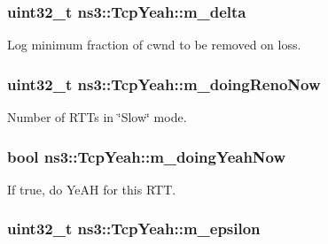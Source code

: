 \subsubsection[{\texorpdfstring{m\+\_\+delta}{m_delta}}]{\setlength{\rightskip}{0pt plus 5cm}uint32\+\_\+t ns3\+::\+Tcp\+Yeah\+::m\+\_\+delta\hspace{0.3cm}{\ttfamily [private]}}\hypertarget{classns3_1_1TcpYeah_af36b0f4c1017a437469d909a22650f84}{}\label{classns3_1_1TcpYeah_af36b0f4c1017a437469d909a22650f84}


Log minimum fraction of cwnd to be removed on loss. 

\subsubsection[{\texorpdfstring{m\+\_\+doing\+Reno\+Now}{m_doingRenoNow}}]{\setlength{\rightskip}{0pt plus 5cm}uint32\+\_\+t ns3\+::\+Tcp\+Yeah\+::m\+\_\+doing\+Reno\+Now\hspace{0.3cm}{\ttfamily [private]}}\hypertarget{classns3_1_1TcpYeah_ad70d5e4310bd47c13bdfe5a665a4a911}{}\label{classns3_1_1TcpYeah_ad70d5e4310bd47c13bdfe5a665a4a911}


Number of R\+T\+Ts in \char`\"{}\+Slow\char`\"{} mode. 

\subsubsection[{\texorpdfstring{m\+\_\+doing\+Yeah\+Now}{m_doingYeahNow}}]{\setlength{\rightskip}{0pt plus 5cm}bool ns3\+::\+Tcp\+Yeah\+::m\+\_\+doing\+Yeah\+Now\hspace{0.3cm}{\ttfamily [private]}}\hypertarget{classns3_1_1TcpYeah_a25cd1e84b0c21841c03a0c9b539f1006}{}\label{classns3_1_1TcpYeah_a25cd1e84b0c21841c03a0c9b539f1006}


If true, do Ye\+AH for this R\+TT. 

\subsubsection[{\texorpdfstring{m\+\_\+epsilon}{m_epsilon}}]{\setlength{\rightskip}{0pt plus 5cm}uint32\+\_\+t ns3\+::\+Tcp\+Yeah\+::m\+\_\+epsilon\hspace{0.3cm}{\ttfamily [private]}}\hypertarget{classns3_1_1TcpYeah_acd0da743a9c773afb1f4e295bc95b22c}{}\label{classns3_1_1TcpYeah_acd0da743a9c773afb1f4e295bc95b22c}


